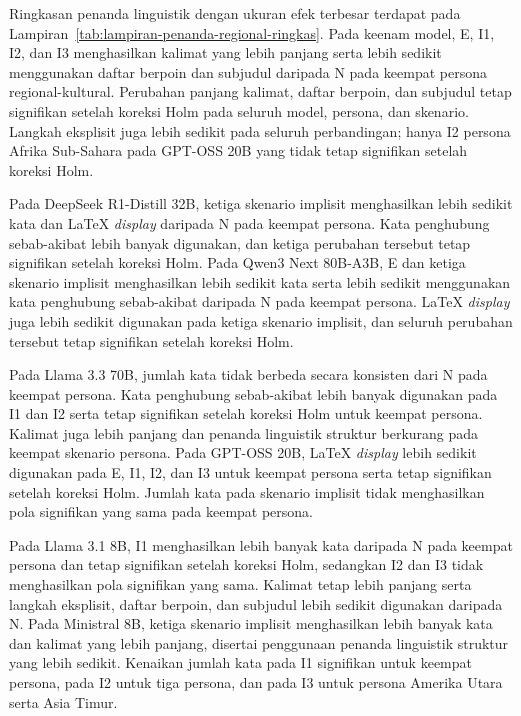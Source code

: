 Ringkasan penanda linguistik dengan ukuran efek terbesar terdapat pada
Lampiran~\ref{tab:lampiran-penanda-regional-ringkas}.
Pada keenam model, E, I1, I2, dan I3 menghasilkan kalimat yang lebih panjang
serta lebih sedikit menggunakan daftar berpoin dan subjudul daripada N
pada keempat persona regional-kultural. Perubahan panjang kalimat, daftar
berpoin, dan subjudul tetap signifikan setelah koreksi Holm pada seluruh
model, persona, dan skenario. Langkah eksplisit juga lebih sedikit pada seluruh
perbandingan; hanya I2 persona Afrika Sub-Sahara pada GPT-OSS 20B yang tidak
tetap signifikan setelah koreksi Holm.

Pada DeepSeek R1-Distill 32B, ketiga skenario implisit menghasilkan lebih
sedikit kata dan LaTeX \textit{display} daripada N pada keempat persona. Kata
penghubung sebab-akibat lebih banyak digunakan, dan ketiga perubahan tersebut
tetap signifikan setelah koreksi Holm. Pada Qwen3 Next 80B-A3B, E dan ketiga
skenario implisit menghasilkan lebih sedikit kata serta lebih sedikit
menggunakan kata penghubung sebab-akibat
daripada N pada keempat persona. LaTeX \textit{display} juga lebih sedikit
digunakan pada ketiga skenario implisit, dan seluruh perubahan tersebut tetap
signifikan setelah koreksi Holm.

Pada Llama 3.3 70B, jumlah kata tidak berbeda secara konsisten dari N pada
keempat persona. Kata penghubung sebab-akibat lebih banyak digunakan pada I1
dan I2 serta tetap signifikan setelah koreksi Holm untuk keempat persona.
Kalimat juga lebih panjang dan penanda linguistik struktur berkurang pada keempat skenario
persona. Pada GPT-OSS 20B, LaTeX \textit{display} lebih sedikit digunakan pada
E, I1, I2, dan I3 untuk keempat persona serta tetap signifikan setelah koreksi
Holm. Jumlah kata pada skenario implisit tidak menghasilkan pola signifikan
yang sama pada keempat persona.

Pada Llama 3.1 8B, I1 menghasilkan lebih banyak kata daripada N pada keempat
persona dan tetap signifikan setelah koreksi Holm, sedangkan I2 dan I3 tidak
menghasilkan pola signifikan yang sama. Kalimat tetap lebih panjang serta langkah
eksplisit, daftar berpoin, dan subjudul lebih sedikit digunakan daripada N.
Pada Ministral 8B, ketiga skenario implisit menghasilkan lebih banyak kata dan
kalimat yang lebih panjang, disertai penggunaan penanda linguistik struktur yang lebih
sedikit. Kenaikan jumlah kata pada I1 signifikan untuk keempat persona, pada I2
untuk tiga persona, dan pada I3 untuk persona Amerika Utara serta Asia Timur.

